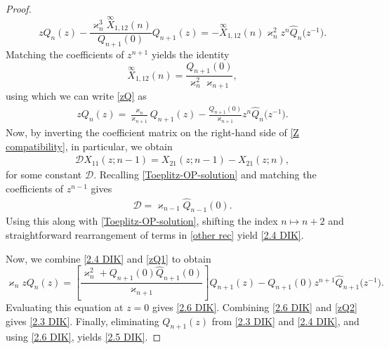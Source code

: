 \documentclass[10pt,a4paper]{amsart}
\numberwithin{equation}{section}
\begin{document}
\begin{proof}
\begin{equation}
				z Q_n(z) - \frac{\varkappa^3_n \overset{\infty}{X}_{1,12}(n)}{Q_{n+1}(0)}Q_{n+1}(z) = - \overset{\infty}{X}_{1,12}(n) \varkappa^2_n z^n \widehat{Q}_n\big(z^{-1}\big).
			\end{equation}
			Matching the coefficients of $z^{n+1}$ yields the identity
			\begin{equation*}
				\overset{\infty}{X}_{1,12}(n) = \frac{Q_{n+1}(0)}{\varkappa^2_{n} \varkappa_{n+1}},
			\end{equation*}
			using which we can write \eqref{zQ} as
			\begin{gather}\label{zQ1}
				z Q_n(z) = \frac{\varkappa_n}{\varkappa_{n+1}}Q_{n+1}(z) - \frac{Q_{n+1}(0)}{\varkappa_{n+1}} z^n \widehat{Q}_n\big(z^{-1}\big).
			\end{gather}
			Now, by inverting the coefficient matrix on the right-hand side of \eqref{Z compatibility}, in particular, we obtain
			\begin{gather}\label{other rec}
				\mathcal{D} X_{11}(z;n-1) = X_{21}(z;n-1)-X_{21}(z;n),
			\end{gather}
			for some constant $\mathcal{D}$. Recalling \eqref{Toeplitz-OP-solution} and matching the coefficients of $z^{n-1}$ gives \begin{gather*}
				\mathcal{D} = \varkappa_{n-1}\widehat{Q}_{n-1}(0).
			\end{gather*}
			Using this along with \eqref{Toeplitz-OP-solution}, shifting the index $n \mapsto n+2$	and straightforward rearrangement of terms in \eqref{other rec} yield \eqref{2.4 DIK}.
			
			Now, we combine \eqref{2.4 DIK} and \eqref{zQ1} to obtain
			\begin{equation}\label{zQ2}
				\varkappa_n z Q_n(z) = \left[ \frac{\varkappa^2_{n} + Q_{n+1}(0) \widehat{Q}_{n+1}(0) }{\varkappa_{n+1}} \right] Q_{n+1}(z) - Q_{n+1}(0) z^{n+1} \widehat{Q}_{n+1}\big(z^{-1}\big).
			\end{equation}
			Evaluating this equation at $z=0$ gives \eqref{2.6 DIK}. Combining \eqref{2.6 DIK} and \eqref{zQ2} gives \eqref{2.3 DIK}. Finally, eliminating $Q_{n+1}(z)$ from \eqref{2.3 DIK} and \eqref{2.4 DIK}, and using \eqref{2.6 DIK}, yields \eqref{2.5 DIK}.
		\end{proof}
		
		
\end{document}
